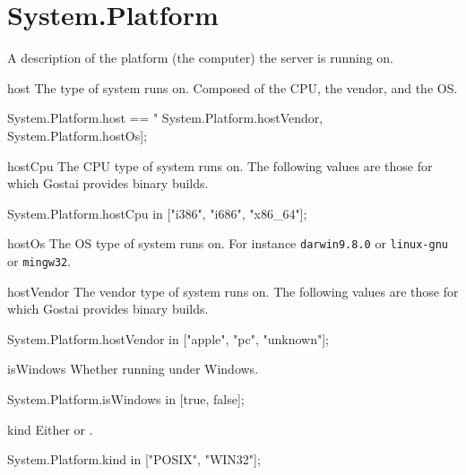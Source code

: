 
\section{System.Platform}
A description of the platform (the computer) the server is running on.

\begin{urbiscriptapi}
\item[host] The type of system \usdk runs on.  Composed of the CPU, the
  vendor, and the OS.
\begin{urbiassert}
System.Platform.host ==
  "%
                System.Platform.hostVendor,
                System.Platform.hostOs];
\end{urbiassert}

\item[hostCpu] The CPU type of system \usdk runs on.  The following values
  are those for which Gostai provides binary builds.
\begin{urbiassert}
System.Platform.hostCpu in ["i386", "i686", "x86_64"];
\end{urbiassert}

\item[hostOs] The OS type of system \usdk runs on.  For instance
  \lstinline|darwin9.8.0| or \lstinline|linux-gnu| or \lstinline|mingw32|.

\item[hostVendor] The vendor type of system \usdk runs on.  The following
  values are those for which Gostai provides binary builds.
\begin{urbiassert}
System.Platform.hostVendor in ["apple", "pc", "unknown"];
\end{urbiassert}

\item[isWindows] Whether running under Windows.
\begin{urbiassert}
System.Platform.isWindows in [true, false];
\end{urbiassert}

\item[kind] Either  or .
\begin{urbiassert}
System.Platform.kind in ["POSIX", "WIN32"];
\end{urbiassert}
\end{urbiscriptapi}

